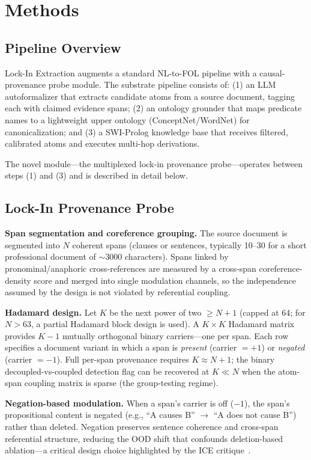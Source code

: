 \documentclass[11pt,letterpaper]{article}
\begin{document}
\section{Methods}
\label{sec:methods}

\subsection{Pipeline Overview}

Lock-In Extraction augments a standard NL-to-FOL pipeline with a causal-provenance probe module. The substrate
pipeline consists of: (1) an LLM autoformalizer that extracts candidate atoms from a source document, tagging each
with claimed evidence spans; (2) an ontology grounder that maps predicate names to a lightweight upper ontology
(ConceptNet/WordNet) for canonicalization; and (3) a SWI-Prolog knowledge base that receives filtered, calibrated
atoms and executes multi-hop derivations.

The novel module---the multiplexed lock-in provenance probe---operates between steps (1) and (3) and is described in
detail below.

\subsection{Lock-In Provenance Probe}

\textbf{Span segmentation and coreference grouping.} The source document is segmented into $N$ coherent spans
(clauses or sentences, typically 10--30 for a short professional document of ${\sim}3000$ characters). Spans linked by
pronominal/anaphoric cross-references are measured by a cross-span coreference-density score and merged into single
modulation channels, so the independence assumed by the design is not violated by referential coupling.

\textbf{Hadamard design.} Let $K$ be the next power of two $\geq N+1$ (capped at 64; for $N > 63$, a partial
Hadamard block design is used). A $K \times K$ Hadamard matrix provides $K-1$ mutually orthogonal binary carriers---one
per span. Each row specifies a document variant in which a span is \emph{present} (carrier $= +1$) or \emph{negated}
(carrier $= -1$). Full per-span provenance requires $K \approx N+1$; the binary decoupled-vs-coupled detection flag
can be recovered at $K \ll N$ when the atom-span coupling matrix is sparse (the group-testing regime).

\textbf{Negation-based modulation.} When a span's carrier is off ($-1$), the span's propositional content is negated
(e.g., ``A causes B'' $\to$ ``A does not cause B'') rather than deleted. Negation preserves sentence coherence and
cross-span referential structure, reducing the OOD shift that confounds deletion-based ablation---a critical design
choice highlighted by the ICE critique~\citep{Basu2026}.
\end{document}
